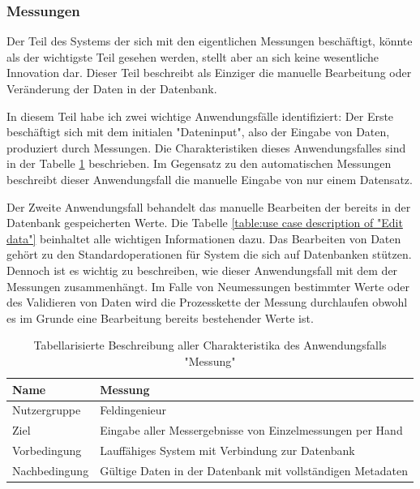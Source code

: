 \subsubsection{Messungen}
Der Teil des Systems der sich mit den eigentlichen Messungen beschäftigt, könnte als der wichtigste Teil gesehen werden, stellt aber an sich keine wesentliche Innovation dar. Dieser Teil beschreibt als Einziger die manuelle Bearbeitung oder Veränderung der Daten in der Datenbank.

In diesem Teil habe ich zwei wichtige Anwendungsfälle identifiziert: Der Erste beschäftigt sich mit dem initialen "Dateninput", also der Eingabe von Daten, produziert durch Messungen. Die Charakteristiken dieses Anwendungsfalles sind in der Tabelle \ref{table:use case description of "Measure data"} beschrieben. Im Gegensatz zu den automatischen Messungen beschreibt dieser Anwendungsfall die manuelle Eingabe von nur einem Datensatz.

Der Zweite Anwendungsfall behandelt das manuelle Bearbeiten der bereits in der Datenbank gespeicherten Werte. Die Tabelle \ref{table:use case description of "Edit data"} beinhaltet alle wichtigen Informationen dazu. Das Bearbeiten von Daten gehört zu den Standardoperationen für System die sich auf Datenbanken stützen. Dennoch ist es wichtig zu beschreiben, wie dieser Anwendungsfall mit dem der Messungen zusammenhängt. Im Falle von Neumessungen bestimmter Werte oder des Validieren von Daten wird die Prozesskette der Messung durchlaufen obwohl es im Grunde eine Bearbeitung bereits bestehender Werte ist.

\begin{table}[H]
\centering
\begin{tabular}{l | p{11cm}}
Name & Messung\\ \hline 
Nutzergruppe & Feldingenieur\\ \hline 
Ziel & Eingabe aller Messergebnisse von Einzelmessungen per Hand\\ \hline 
Vorbedingung & Lauffähiges System mit Verbindung zur Datenbank\\ \hline 
Nachbedingung & Gültige Daten in der Datenbank mit vollständigen Metadaten\\ 
\end{tabular}
\caption{Tabellarisierte Beschreibung aller Charakteristika des Anwendungsfalls "Messung"} 
\label{table:use case description of "Measure data"}
\end{table}

